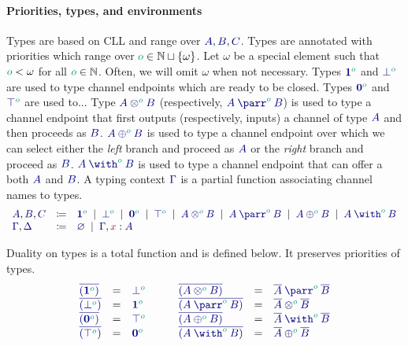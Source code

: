 \documentclass[main.tex]{subfiles}
\begin{document}
\paragraph*{Priorities, types, and environments}
Types are based on CLL and range over $\ty{A}, \ty{B}, \ty{C}$. Types are annotated with priorities which range over $\cs{o} \in \mathbb{N} \sqcup \{\omega\}$. Let $\omega$ be a special element such that $\cs{o}<\omega$ for all $\cs{o}\in \mathbb{N}$. Often, we will omit $\omega$ when not necessary.  Types $\ty{\tyone[\cs{o}]}$ and $\ty{\tybot[\cs{o}]}$ are used to type channel endpoints which are ready to be closed. Types $\ty{\tynil[\cs{o}]}$ and $\ty{\tytop[\cs{o}]}$ are used to... Type $\ty{\tytens[\cs{o}]{A}{B}}$ (respectively, $\ty{\typarr[\cs{o}]{A}{B}}$) is used to type a channel endpoint that first {outputs} (respectively, {inputs}) a channel of type $\ty A$ and then proceeds as $\ty B$. $\ty{\typlus[\cs{o}]{A}{B}}$ is used to type a channel endpoint over which we can {select} either the \emph{left} branch and proceed as $\ty A$ or the \emph{right} branch and proceed as $\ty B$. $\ty{\tywith[\cs{o}]{A}{B}}$ is used to type a channel endpoint that can offer a both $\ty A$ and $\ty B$. A typing context $\ty\Gamma$ is a partial function associating channel names to types.
\[
\begin{array}{lcl}
  \ty{A}, \ty{B}, \ty{C}
  & \coloneqq & \ty{\tyone[\cs{o}]}
    \sep        \ty{\tybot[\cs{o}]}
    \sep        \ty{\tynil[\cs{o}]}
    \sep        \ty{\tytop[\cs{o}]}
    \sep        \ty{\tytens[\cs{o}]{A}{B}}
    \sep        \ty{\typarr[\cs{o}]{A}{B}}
    \sep        \ty{\typlus[\cs{o}]{A}{B}}
    \sep        \ty{\tywith[\cs{o}]{A}{B}}
  \\
  \ty{\Gamma}, \ty{\Delta}
  & \coloneqq & \ty{\emptyenv}
    \sep        \ty{\Gamma}, \tmty{x}{A}
\end{array}
\]

Duality on types is a total function and is defined below. It preserves priorities of types.
\[
\begin{array}{lcl}
  \ty{\co{(\tyone[\cs{o}])}} & = & \ty{\tybot[\cs{o}]} \\
  \ty{\co{(\tybot[\cs{o}])}} & = & \ty{\tyone[\cs{o}]} \\
  \ty{\co{(\tynil[\cs{o}])}} & = & \ty{\tytop[\cs{o}]} \\
  \ty{\co{(\tytop[\cs{o}])}} & = & \ty{\tynil[\cs{o}]}
\end{array}
\qquad
\begin{array}{lcl}
  \ty{\co{(\tytens[\cs{o}]{A}{B})}} & = & \ty{\typarr[\cs{o}]{\co{A}}{\co{B}}} \\
  \ty{\co{(\typarr[\cs{o}]{A}{B})}} & = & \ty{\tytens[\cs{o}]{\co{A}}{\co{B}}} \\
  \ty{\co{(\typlus[\cs{o}]{A}{B})}} & = & \ty{\tywith[\cs{o}]{\co{A}}{\co{B}}} \\
  \ty{\co{(\tywith[\cs{o}]{A}{B})}} & = & \ty{\typlus[\cs{o}]{\co{A}}{\co{B}}}
\end{array}
\]
\end{document}
